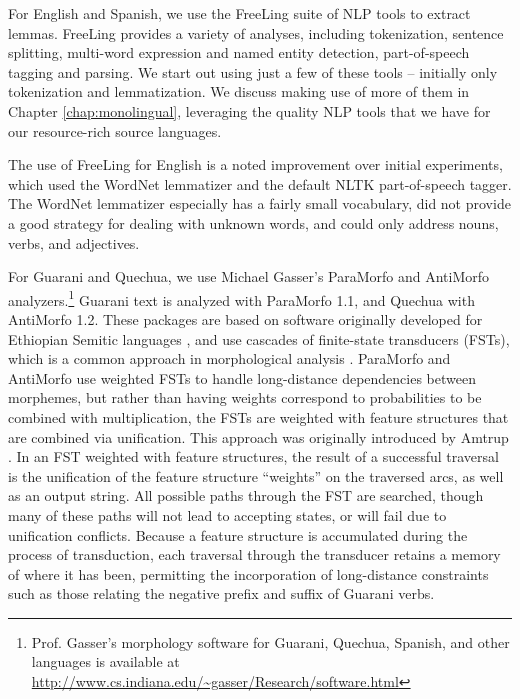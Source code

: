 For English and Spanish, we use the FreeLing suite of NLP tools
\cite{padro12} to extract lemmas. FreeLing provides a variety of analyses,
including tokenization, sentence splitting, multi-word expression and named
entity detection, part-of-speech tagging and parsing.  We start out using just
a few of these tools -- initially only tokenization and lemmatization. We
discuss making use of more of them in Chapter \ref{chap:monolingual},
leveraging the quality NLP tools that we have for our resource-rich source
languages.

The use of FreeLing for English is a noted improvement over initial
experiments, which used the WordNet lemmatizer and the default NLTK
part-of-speech tagger.
The WordNet lemmatizer especially has a fairly small vocabulary, did not
provide a good strategy for dealing with unknown words, and could only address
nouns, verbs, and adjectives.

For Guarani and Quechua, we use Michael Gasser's ParaMorfo and AntiMorfo
analyzers.\footnote{Prof. Gasser's morphology software for Guarani, Quechua,
Spanish, and other languages is available at
\url{http://www.cs.indiana.edu/~gasser/Research/software.html}} Guarani text is
analyzed with ParaMorfo 1.1, and Quechua with AntiMorfo 1.2.  These packages
are based on software originally developed for Ethiopian Semitic languages
\cite{gasser:eacl09}, and use cascades of finite-state transducers (FSTs),
which is a common approach in morphological analysis \cite{beesley+karttunen}.
ParaMorfo and AntiMorfo use weighted FSTs to handle long-distance dependencies
between morphemes, but rather than having weights correspond to probabilities
to be combined with multiplication, the FSTs are weighted with feature
structures that are combined via unification. This approach was originally
introduced by Amtrup \cite{amtrup:03}. In an FST weighted with feature
structures, the result of a successful traversal is the unification of the
feature structure ``weights'' on the traversed arcs, as well as an output
string. All possible paths through the FST are searched, though many of these
paths will not lead to accepting states, or will fail due to unification
conflicts.  Because a feature structure is accumulated during the process of
transduction, each traversal through the transducer retains a memory of where
it has been, permitting the incorporation of long-distance constraints such as
those relating the negative prefix and suffix of Guarani verbs.

